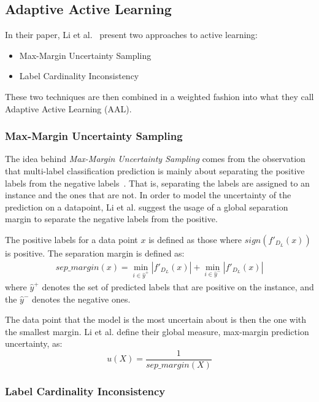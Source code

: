 \subsection{Adaptive Active Learning}\label{subsec:adaptive-active-learning}

In their paper, Li et al\@.~\cite{li2013active} present two approaches to active learning:
\begin{itemize}
    \item Max-Margin Uncertainty Sampling
    \item Label Cardinality Inconsistency 
\end{itemize}
These two techniques are then combined in a weighted fashion into what they call Adaptive Active Learning (AAL).

\subsubsection{Max-Margin Uncertainty Sampling}

The idea behind \textit{Max-Margin Uncertainty Sampling} comes from the observation that multi-label classification prediction is mainly about separating the positive labels from the negative labels~\cite{li2013active}.
That is, separating the labels are assigned to an instance and the ones that are not.
In order to model the uncertainty of the prediction on a datapoint, Li et al\@. suggest the usage of a global separation margin to separate the negative labels from the positive.

The positive labels for a data point $x$ is defined as those where $sign(f'_{D_L}(x))$ is positive.
The separation margin is defined as:
\begin{equation}
    \begin{split}
        sep\_margin(x) = \min_{i \in \hat{y}^+}|f'_{D_L}(x)| + \min_{i \in \hat{y}^-}|f'_{D_L}(x)|
    \end{split}
\end{equation}
where $\hat{y}^+$ denotes the set of predicted labels that are positive on the instance, and the $\hat{y}^-$ denotes the negative ones.

The data point that the model is the most uncertain about is then the one with the smallest margin.
Li et al\@. define their global measure, max-margin prediction uncertainty, as:
\begin{equation}
    u(X) = \frac{1}{sep\_margin(X)}
\end{equation}

\subsubsection{Label Cardinality Inconsistency}

